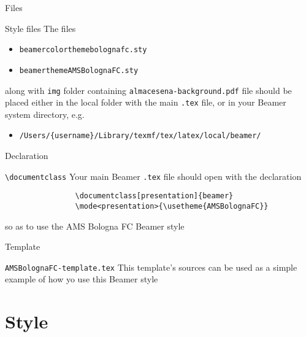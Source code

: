 \documentclass[presentation]{beamer}\mode<presentation>{\usetheme{AMSBolognaFC}}
\begin{document}
	\begin{frame}[c]{Files}
		\begin{block}{Style files}
			The files
			\begin{itemize}
				\item \texttt{beamercolorthemebolognafc.sty}
				\item \texttt{beamerthemeAMSBolognaFC.sty}
			\end{itemize}
			along with \texttt{img} folder containing \texttt{almacesena-background.pdf} file should be placed either in the local folder with the main \texttt{.tex} file, or in your Beamer system directory, e.g.
			\begin{itemize}
				\item \texttt{/Users/\{username\}/Library/texmf/tex/latex/local/beamer/}
			\end{itemize}
		\end{block}
	\end{frame}
	
	\begin{frame}[c,fragile]{Declaration}
		\begin{block}{\texttt{\textbackslash{}documentclass}}
			Your main Beamer \texttt{.tex} file should open with the declaration
			\begin{verbatim}
				\documentclass[presentation]{beamer}
				\mode<presentation>{\usetheme{AMSBolognaFC}}
			\end{verbatim}
			so as to use the AMS Bologna FC Beamer style 
		\end{block}
	\end{frame}
	
	\begin{frame}[c,fragile]{Template}
		\begin{block}{\texttt{AMSBolognaFC-template.tex}}
			This template's sources can be used as a simple example of how yo use this Beamer style
		\end{block}
	\end{frame}
	
	
	\section{Style}
	
\end{document}
